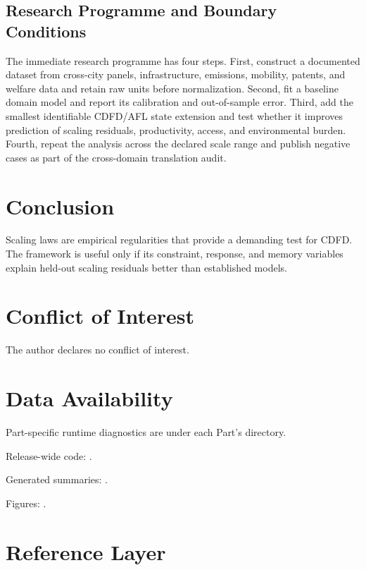 \documentclass[11pt,a4paper]{article}
\begin{document}
\subsection{Research Programme and Boundary Conditions}

The immediate research programme has four steps. First, construct a documented
dataset from cross-city panels, infrastructure, emissions, mobility, patents, and welfare data and retain raw units before normalization.
Second, fit a baseline domain model and report its calibration and out-of-sample
error. Third, add the smallest identifiable CDFD/AFL state extension and test
whether it improves prediction of scaling residuals, productivity, access, and environmental burden. Fourth, repeat the
analysis across the declared scale range and publish negative cases as part of
the cross-domain translation audit.


\section{Conclusion}
Scaling laws are empirical regularities that provide a demanding test for CDFD. The framework is useful only if its constraint, response, and memory variables explain held-out scaling residuals better than established models.
\section*{Conflict of Interest} The author declares no conflict of interest.
\section*{Data Availability}
Part-specific runtime diagnostics are under each Part's  directory.

Release-wide code: .

Generated summaries: .

Figures: .


\section{Reference Layer}


\end{document}

